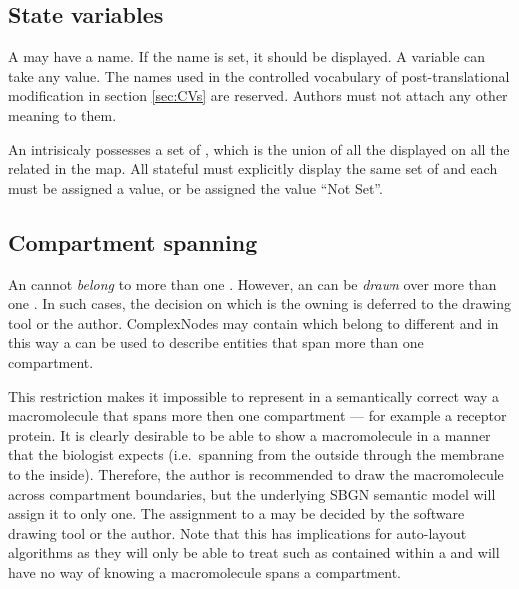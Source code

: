 \subsection{State variables}

A  may have a name. If the
name is set, it should be displayed. A variable can take any
value. The names used in the controlled vocabulary of
post-translational modification in section \ref{sec:CVs} are
reserved. Authors must not attach any other meaning to them.

An  intrisicaly possesses a set of , which is the union
of all the  displayed on all the related  in the map. 
All stateful  must explicitly display the same set of
 and each  must be assigned a value, or be
assigned the value ``Not Set''.

\subsection{Compartment spanning}

An  cannot \emph{belong} to more than one
. However, an  can be \emph{drawn} over more than one
. In such cases, the decision on which is the owning
 is deferred to the drawing tool or the
author. ComplexNodes may contain  which belong to different
 and in this way a  can be used to describe
entities that span more than one {compartment}.

This restriction makes it impossible to represent in a semantically
correct way a macromolecule that spans more then one compartment ---
for example a receptor protein. It is clearly desirable to be able to
show a macromolecule in a manner that the biologist expects (i.e.\,
spanning from the outside through the membrane to the
inside). Therefore, the author is recommended to draw the
macromolecule across compartment boundaries, but the underlying SBGN
semantic model will assign it to only one. The assignment to a
 may be decided by the software drawing tool or the
author. Note that this has implications for auto-layout algorithms as
they will only be able to treat such  as contained within
a  and will have no way of knowing a macromolecule spans a
compartment.

